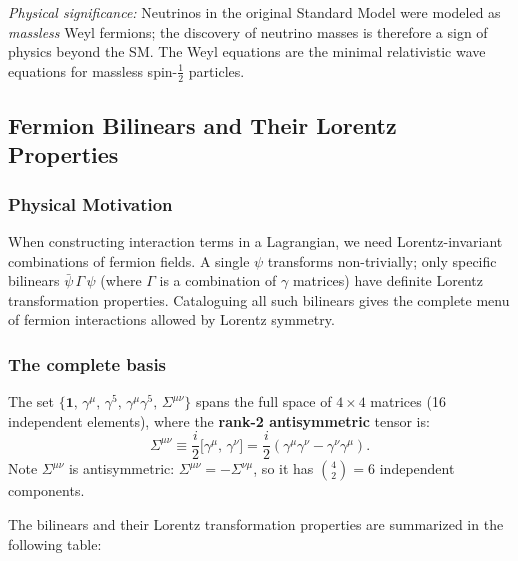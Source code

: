 \documentclass[../main.tex]{subfiles}
\begin{document}
\textit{Physical significance:} Neutrinos in the original Standard Model were modeled as \emph{massless} Weyl fermions; the discovery of neutrino masses is therefore a sign of physics beyond the SM.  The Weyl equations are the minimal relativistic wave equations for massless spin-$\tfrac{1}{2}$ particles.

\subsection*{Fermion Bilinears and Their Lorentz Properties}

\subsubsection*{Physical Motivation}

When constructing interaction terms in a Lagrangian, we need Lorentz-invariant combinations of fermion fields.  A single $\psi$ transforms non-trivially; only specific bilinears $\bar\psi\,\Gamma\,\psi$ (where $\Gamma$ is a combination of $\gamma$ matrices) have definite Lorentz transformation properties.  Cataloguing all such bilinears gives the complete menu of fermion interactions allowed by Lorentz symmetry.

\subsubsection*{The complete basis}

The set $\{\mathbf{1},\,\gamma^\mu,\,\gamma^5,\,\gamma^\mu\gamma^5,\,\Sigma^{\mu\nu}\}$ spans the full space of $4\times4$ matrices (16 independent elements), where the \textbf{rank-2 antisymmetric} tensor is:
\begin{equation}
  \Sigma^{\mu\nu} \equiv \frac{i}{2}\bigl[\gamma^\mu,\,\gamma^\nu\bigr]
  = \frac{i}{2}(\gamma^\mu\gamma^\nu - \gamma^\nu\gamma^\mu).
  \label{eq:lec08:Sigma-def}
\end{equation}
Note $\Sigma^{\mu\nu}$ is antisymmetric: $\Sigma^{\mu\nu} = -\Sigma^{\nu\mu}$, so it has $\binom{4}{2} = 6$ independent components.

The bilinears and their Lorentz transformation properties are summarized in the following table:
\end{document}
